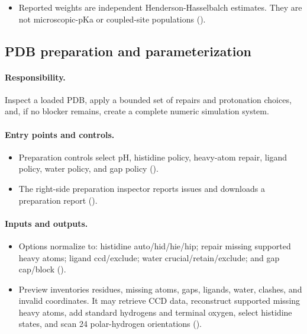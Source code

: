 \documentclass[11pt]{article}
\begin{document}
\begin{small}
\begin{itemize}[leftmargin=*]
\item Reported weights are independent Henderson-Hasselbalch estimates. They are not microscopic-pKa or coupled-site populations ().

\end{itemize}

\subsection{PDB preparation and parameterization}\label{appB:sec6}

\paragraph{Responsibility.}

Inspect a loaded PDB, apply a bounded set of repairs and protonation choices, and, if no blocker remains, create a complete numeric simulation system.

\paragraph{Entry points and controls.}

\begin{itemize}[leftmargin=*]

\item Preparation controls select pH, histidine policy, heavy-atom repair, ligand policy, water policy, and gap policy ().

\item The right-side preparation inspector reports issues and downloads a preparation report ().

\end{itemize}

\paragraph{Inputs and outputs.}

\begin{itemize}[leftmargin=*]

\item Options normalize to: histidine auto/hid/hie/hip; repair missing supported heavy atoms; ligand ccd/exclude; water crucial/retain/exclude; and gap cap/block ().

\item Preview inventories residues, missing atoms, gaps, ligands, water, clashes, and invalid coordinates. It may retrieve CCD data, reconstruct supported missing heavy atoms, add standard hydrogens and terminal oxygen, select histidine states, and scan 24 polar-hydrogen orientations ().


\end{itemize}
\end{small}
\end{document}
